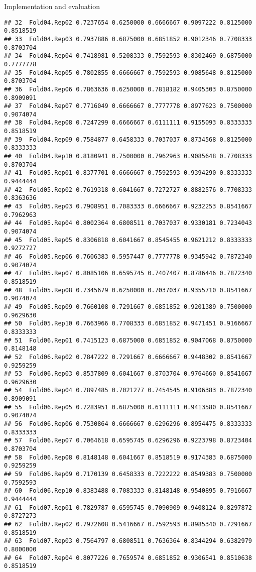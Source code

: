 \documentclass[
  ignorenonframetext,
]{beamer}
\begin{document}
\begin{frame}[fragile]{Implementation and evaluation}
\begin{verbatim}
## 32  Fold04.Rep02 0.7237654 0.6250000 0.6666667 0.9097222 0.8125000 0.8518519
## 33  Fold04.Rep03 0.7937886 0.6875000 0.6851852 0.9012346 0.7708333 0.8703704
## 34  Fold04.Rep04 0.7418981 0.5208333 0.7592593 0.8302469 0.6875000 0.7777778
## 35  Fold04.Rep05 0.7802855 0.6666667 0.7592593 0.9085648 0.8125000 0.8703704
## 36  Fold04.Rep06 0.7863636 0.6250000 0.7818182 0.9405303 0.8750000 0.8909091
## 37  Fold04.Rep07 0.7716049 0.6666667 0.7777778 0.8977623 0.7500000 0.9074074
## 38  Fold04.Rep08 0.7247299 0.6666667 0.6111111 0.9155093 0.8333333 0.8518519
## 39  Fold04.Rep09 0.7584877 0.6458333 0.7037037 0.8734568 0.8125000 0.8333333
## 40  Fold04.Rep10 0.8180941 0.7500000 0.7962963 0.9085648 0.7708333 0.8703704
## 41  Fold05.Rep01 0.8377701 0.6666667 0.7592593 0.9394290 0.8333333 0.9444444
## 42  Fold05.Rep02 0.7619318 0.6041667 0.7272727 0.8882576 0.7708333 0.8363636
## 43  Fold05.Rep03 0.7908951 0.7083333 0.6666667 0.9232253 0.8541667 0.7962963
## 44  Fold05.Rep04 0.8002364 0.6808511 0.7037037 0.9330181 0.7234043 0.9074074
## 45  Fold05.Rep05 0.8306818 0.6041667 0.8545455 0.9621212 0.8333333 0.9272727
## 46  Fold05.Rep06 0.7606383 0.5957447 0.7777778 0.9345942 0.7872340 0.9074074
## 47  Fold05.Rep07 0.8085106 0.6595745 0.7407407 0.8786446 0.7872340 0.8518519
## 48  Fold05.Rep08 0.7345679 0.6250000 0.7037037 0.9355710 0.8541667 0.9074074
## 49  Fold05.Rep09 0.7660108 0.7291667 0.6851852 0.9201389 0.7500000 0.9629630
## 50  Fold05.Rep10 0.7663966 0.7708333 0.6851852 0.9471451 0.9166667 0.8333333
## 51  Fold06.Rep01 0.7415123 0.6875000 0.6851852 0.9047068 0.8750000 0.8148148
## 52  Fold06.Rep02 0.7847222 0.7291667 0.6666667 0.9448302 0.8541667 0.9259259
## 53  Fold06.Rep03 0.8537809 0.6041667 0.8703704 0.9764660 0.8541667 0.9629630
## 54  Fold06.Rep04 0.7897485 0.7021277 0.7454545 0.9106383 0.7872340 0.8909091
## 55  Fold06.Rep05 0.7283951 0.6875000 0.6111111 0.9413580 0.8541667 0.9074074
## 56  Fold06.Rep06 0.7530864 0.6666667 0.6296296 0.8954475 0.8333333 0.8333333
## 57  Fold06.Rep07 0.7064618 0.6595745 0.6296296 0.9223798 0.8723404 0.8703704
## 58  Fold06.Rep08 0.8148148 0.6041667 0.8518519 0.9174383 0.6875000 0.9259259
## 59  Fold06.Rep09 0.7170139 0.6458333 0.7222222 0.8549383 0.7500000 0.7592593
## 60  Fold06.Rep10 0.8383488 0.7083333 0.8148148 0.9540895 0.7916667 0.9444444
## 61  Fold07.Rep01 0.7829787 0.6595745 0.7090909 0.9408124 0.8297872 0.8727273
## 62  Fold07.Rep02 0.7972608 0.5416667 0.7592593 0.8985340 0.7291667 0.8518519
## 63  Fold07.Rep03 0.7564797 0.6808511 0.7636364 0.8344294 0.6382979 0.8000000
## 64  Fold07.Rep04 0.8077226 0.7659574 0.6851852 0.9306541 0.8510638 0.8518519

\end{verbatim}
\end{frame}
\end{document}
